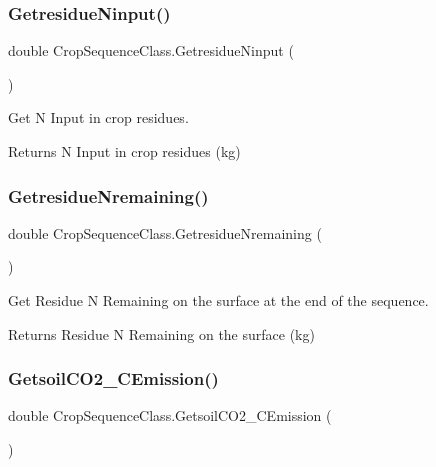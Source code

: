 \subsubsection{\texorpdfstring{GetresidueNinput()}{GetresidueNinput()}}
{\footnotesize\ttfamily double Crop\+Sequence\+Class.\+Getresidue\+Ninput (\begin{DoxyParamCaption}{ }\end{DoxyParamCaption})\hspace{0.3cm}{\ttfamily [inline]}}



Get N Input in crop residues. 

\begin{DoxyReturn}{Returns}
N Input in crop residues (kg) 
\end{DoxyReturn}
\mbox{\label{class_crop_sequence_class_a27436b7d13bd24370f86e6d684ca2de4}} 
\subsubsection{\texorpdfstring{GetresidueNremaining()}{GetresidueNremaining()}}
{\footnotesize\ttfamily double Crop\+Sequence\+Class.\+Getresidue\+Nremaining (\begin{DoxyParamCaption}{ }\end{DoxyParamCaption})\hspace{0.3cm}{\ttfamily [inline]}}



Get Residue N Remaining on the surface at the end of the sequence. 

\begin{DoxyReturn}{Returns}
Residue N Remaining on the surface (kg) 
\end{DoxyReturn}
\mbox{\label{class_crop_sequence_class_a4e23005ff8a380dd656fe12571788da2}} 
\subsubsection{\texorpdfstring{GetsoilCO2\_CEmission()}{GetsoilCO2\_CEmission()}}
{\footnotesize\ttfamily double Crop\+Sequence\+Class.\+Getsoil\+C\+O2\+\_\+\+C\+Emission (\begin{DoxyParamCaption}{ }\end{DoxyParamCaption})\hspace{0.3cm}{\ttfamily [inline]}}



